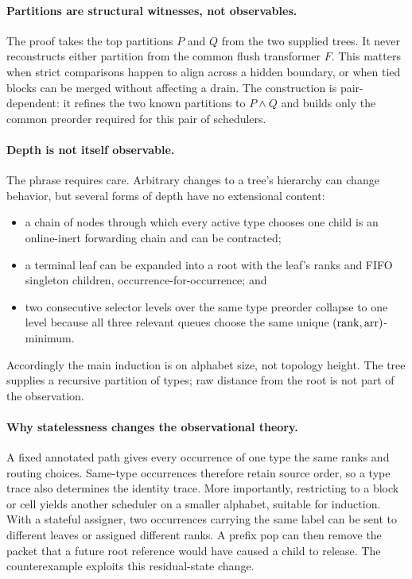 \paragraph{Partitions are structural witnesses, not observables.}
The proof takes the top partitions \(P\) and \(Q\) from the two supplied trees.
It never reconstructs either partition from the common flush transformer
\(F\).  This matters when strict comparisons happen to align across a hidden
boundary, or when tied blocks can be merged without affecting a drain.  The
construction is pair-dependent: it refines the two known partitions to
\(P\wedge Q\) and builds only the common preorder required for this pair of
schedulers.

\paragraph{Depth is not itself observable.}
The phrase requires care.  Arbitrary changes to a tree's hierarchy can change
behavior, but several forms of depth have no extensional content:

\begin{itemize}
\item a chain of nodes through which every active type chooses one child is an
      online-inert forwarding chain and can be contracted;
\item a terminal leaf can be expanded into a root with the leaf's ranks and
      FIFO singleton children, occurrence-for-occurrence; and
\item two consecutive selector levels over the same type preorder collapse to
      one level because all three relevant queues choose the same unique
      \((\operatorname{rank},\operatorname{arr})\)-minimum.
\end{itemize}

Accordingly the main induction is on alphabet size, not topology height.  The
tree supplies a recursive partition of types; raw distance from the root is
not part of the observation.

\paragraph{Why statelessness changes the observational theory.}
A fixed annotated path gives every occurrence of one type the same ranks and
routing choices.  Same-type occurrences therefore retain source order, so a
type trace also determines the identity trace.  More importantly, restricting
to a block or cell yields another scheduler on a smaller alphabet, suitable
for induction.  With a stateful assigner, two occurrences carrying the same
label can be sent to different leaves or assigned different ranks.  A prefix
pop can then remove the packet that a future root reference would have caused
a child to release.  The counterexample exploits this residual-state change.

